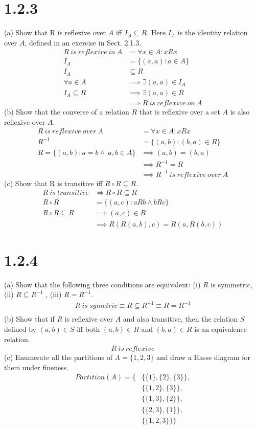 \documentclass{article}
\begin{document}
\section*{1.2.3}
(a) Show that R is reflexive over $A$ iff $I_A \subseteq R$. Here $I_A$ is the identity relation over $A$, defined in an exercise in Sect. 2.1.3.
\begin{align*}
    R\ is\ reflexive\ in\ A &= \forall x \in A: xRx\\
    I_A &= \{(a,a): a \in A\}\\
    I_A &\subseteq R\\
    \forall a \in A &\implies \exists (a, a) \in I_A\\
    I_A \subseteq R &\implies \exists(a,a) \in R\\
    &\implies R\ is\ reflexive\ on\ A
\end{align*}
(b) Show that the converse of a relation $R$ that is reflexive over a set $A$ is also reflexive over $A$.
\begin{align*}
    R\ is\ reflexive\ over\ A &= \forall x \in A: xRx\\
    R^{-1} &= \{(a, b): (b, a) \in R\}\\
    R = \{(a, b): a = b \wedge\ a, b \in A\} &\implies (a, b) = (b, a)\\
    &\implies R^{-1} = R\\
    &\implies R^{-1}\ is\ reflexive\ over\ A
\end{align*}
(c) Show that R is transitive iff $R \circ R \subseteq R$.
 \begin{align*}
     R\ is\ transitive &\iff R \circ R \subseteq R\\
     R \circ R &= \{(a, c): aRb \wedge bRc\}\\
     R \circ R \subseteq R &\implies (a, c) \in R\\
     &\implies R(R(a,b), c) = R(a, R(b, c))
 \end{align*}
\section*{1.2.4}
(a) Show that the following three conditions are equivalent: (i) $R$ is symmetric, (ii) $R \subseteq R^{-1}$ , (iii) $R = R^{-1}$.
\begin{align*}
    R\ is\ symetric \equiv R \subseteq R^{-1} \equiv R = R^{-1}\\
\end{align*}
(b) Show that if $R$ is reflexive over $A$ and also transitive, then the relation $S$ defined by $(a,b) \in S$ iff both $(a,b) \in R$ and $(b,a) \in R$ is an equivalence relation.
\begin{align*}
    R\ is\ reflexive
\end{align*}
(c) Enumerate all the partitions of $A=\{ 1, 2, 3 \}$ and draw a Hasse diagram for them under fineness.
\begin{align*}
    Partition(A) =\{&\{\{1\}, \{2\}, \{3\}\},\\
    &\{\{1, 2\},\{3\}\},\\
    &\{\{1, 3\},\{2\}\},\\
    &\{\{2, 3\},\{1\}\},\\
    &\{\{1, 2, 3\}\}\}
\end{align*}
\end{document}

